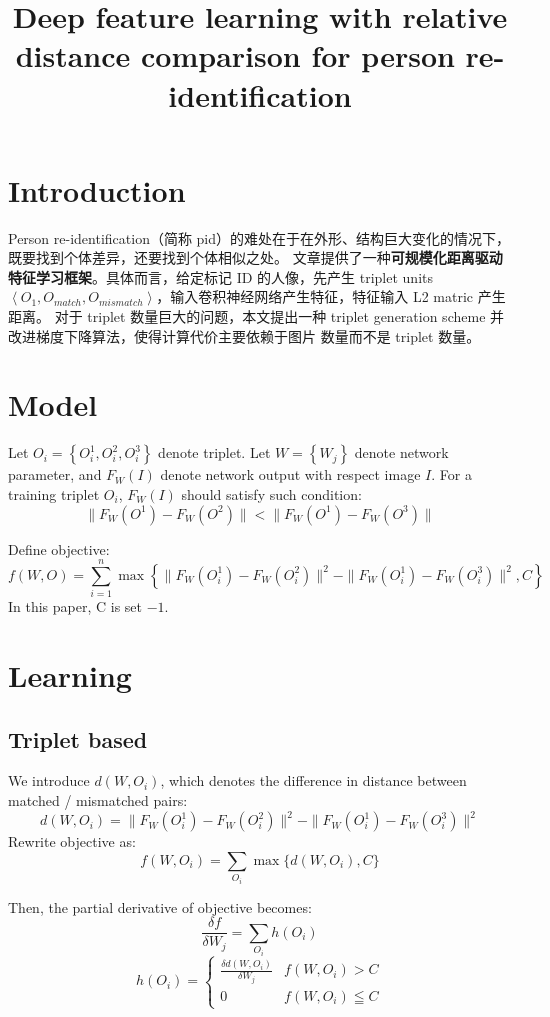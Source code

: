 

\title{Deep feature learning with relative distance comparison for person re-identification}
\maketitle

\section{Introduction}
Person re-identification（简称 pid）的难处在于在外形、结构巨大变化的情况下，既要找到个体差异，还要找到个体相似之处。
文章提供了一种\textbf{可规模化距离驱动特征学习框架}。具体而言，给定标记 ID 的人像，先产生 triplet units
$ \left< O_1, O_{match}, O_{mismatch} \right>$，输入卷积神经网络产生特征，特征输入 L2 matric 产生距离。
对于 triplet 数量巨大的问题，本文提出一种 triplet generation scheme 并改进梯度下降算法，使得计算代价主要依赖于图片
数量而不是 triplet 数量。

\section{Model}
Let $O_i = \left\{ O_i^1, O_i^2, O_i^3 \right\}$ denote triplet. Let $W = \left\{ W_j \right\}$ denote network
parameter, and $F_W(I)$ denote network output with respect image $I$. For a training triplet $O_i$, $F_W(I)$
should satisfy such condition:
\[
	\parallel F_W(O^1) - F_W(O^2) \parallel < \parallel F_W(O^1) - F_W(O^3) \parallel
\]

Define objective:
\[
	f(W, O) = \sum_{i=1}^{n} \max \left\{
		\parallel F_W(O_i^1) - F_W(O_i^2) \parallel^2 - \parallel F_W(O_i^1) - F_W(O_i^3) \parallel^2,
		C \right\}
\]
In this paper, C is set $-1$.

\section{Learning}

\subsection{Triplet based}
We introduce $d(W, O_i)$, which denotes the difference in distance between matched / mismatched pairs:
\[
	d(W, O_i) = \parallel F_W(O_i^1) - F_W(O_i^2) \parallel^2 - \parallel F_W(O_i^1) - F_W(O_i^3) \parallel^2
\]
Rewrite objective as:
\[
	f(W, O_i) = \sum_{O_i} \max \{ d(W, O_i), C \}
\]

Then, the partial derivative of objective becomes:
\[
	\frac{\delta f}{\delta W_j} = \sum_{O_i} h(O_i)
\]
\[
	h(O_i) = 
	\begin{cases}
		\frac{ \delta d(W, O_i) }{ \delta W_j } & f(W, O_i) > C \\
		0										& f(W, O_i) \leqq C
	\end{cases}
\]

